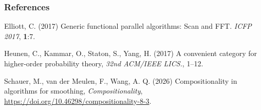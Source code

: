 \documentclass[mathserif,handout]{beamer}
\begin{document}
\begin{frame}
  \frametitle{References}

  
  \begin{thebibliography}{}
    
\bibitem{} Elliott, C. (2017) \alert{Generic functional parallel algorithms: Scan and FFT}. \emph{ICFP 2017}, \textbf{1}:7.

   

\bibitem{} Heunen, C., Kammar, O., Staton, S., Yang, H. (2017) \alert{A convenient category for higher-order probability theory}, \emph{32nd ACM/IEEE LICS.}, 1--12.
     


\bibitem{} Schauer, M., van der Meulen, F.,  Wang, A. Q. (2026) \alert{Compositionality in algorithms for smoothing}, \emph{Compositionality}, \url{https://doi.org/10.46298/compositionality-8-3}.
        




\end{thebibliography}
\end{frame}
\end{document}
